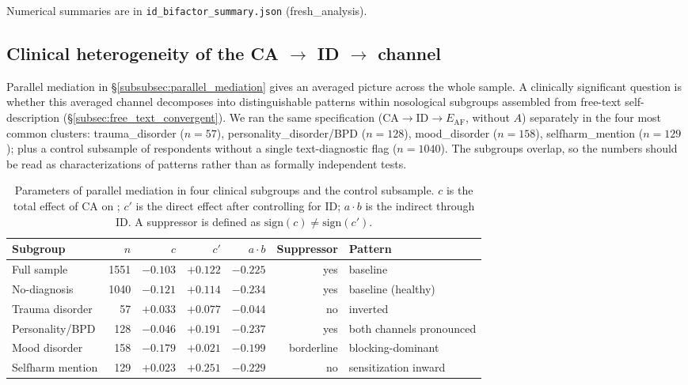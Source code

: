 Numerical summaries are in \texttt{id\_bifactor\_summary.json} (fresh\_analysis).

\subsection{Clinical heterogeneity of the CA $\to$ ID $\to$ \EAF{} channel}
\label{subsec:clinical_subgroup_patterns}

Parallel mediation in §\ref{subsubsec:parallel_mediation} gives an averaged picture across the whole sample. A clinically significant question is whether this averaged channel decomposes into distinguishable patterns within nosological subgroups assembled from free-text self-description (§\ref{subsec:free_text_convergent}). We ran the same specification ($\mathrm{CA} \to \mathrm{ID} \to E_{\mathrm{AF}}$, without $A$) separately in the four most common clusters: trauma\_disorder ($n=57$), personality\_disorder/BPD ($n=128$), mood\_disorder ($n=158$), selfharm\_mention ($n=129$); plus a control subsample of respondents without a single text-diagnostic flag ($n=1040$). The subgroups overlap, so the numbers should be read as characterizations of patterns rather than as formally independent tests.

\begin{table}[htbp]
\centering
\small
\caption[Four clinical patterns of the CA $\to$ ID $\to$ \EAF{} channel]{Parameters of parallel mediation in four clinical subgroups and the control subsample. $c$ is the total effect of CA on \EAF{}; $c'$ is the direct effect after controlling for ID; $a \cdot b$ is the indirect through ID. A suppressor is defined as $\mathrm{sign}(c) \neq \mathrm{sign}(c')$.}
\label{tab:clinical_subgroup_patterns}
\begin{tabular}{lrrrrrl}
\hline
Subgroup & $n$ & $c$ & $c'$ & $a \cdot b$ & Suppressor & Pattern \\
\hline
Full sample & 1551 & $-0.103$ & $+0.122$ & $-0.225$ & yes & baseline \\
No-diagnosis & 1040 & $-0.121$ & $+0.114$ & $-0.234$ & yes & baseline (healthy) \\
Trauma disorder & 57 & $+0.033$ & $+0.077$ & $-0.044$ & no & inverted \\
Personality/BPD & 128 & $-0.046$ & $+0.191$ & $-0.237$ & yes & both channels pronounced \\
Mood disorder & 158 & $-0.179$ & $+0.021$ & $-0.199$ & borderline & blocking-dominant \\
Selfharm mention & 129 & $+0.023$ & $+0.251$ & $-0.229$ & no & sensitization inward \\
\hline
\end{tabular}
\end{table}

